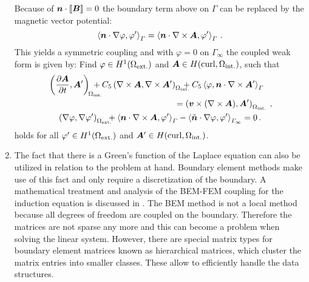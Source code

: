 \begin{enumerate}
	Because of $\bm{n}\cdot\left[\!\left[\bm{B}\right]\!\right]=0$ the boundary term above on $\varGamma$  can be replaced by the magnetic vector potential:
	\begin{equation}
		\label{eqn:RandPhi}
		\left\langle\bm{n}\cdot\nabla\varphi,\varphi'\right\rangle_{\varGamma}=\left\langle\bm{n}\cdot\nabla\times\bm{A},\varphi'\right\rangle_{\varGamma}\,.
	\end{equation}
	This yields a symmetric coupling and with $\varphi=0$ on $\varGamma_\infty$ the coupled weak form is given by: Find $\varphi\in H^1(\Omega_\mathrm{ext.})$ and $\bm{A}\in H(\operatorname{curl}, \Omega_\mathrm{int.})$, such that
	\begin{subequations}
		\label{eqn:WeakFormFinal}
		\begin{gather}
		\begin{multlined}[c]
		\left(\pd{\bm{A}}{t},\bm{A}'\right)_{\!\mathrlap{\Omega_\mathrm{int.}}\ }
		+C_5\left(\nabla\times\bm{A},\nabla\times\bm{A}'\right)_{\mathrlap{\Omega_\mathrm{int.}}\ \ }+C_5\left\langle\vp,\bm{n}\cdot\nabla\times\bm{A}'\right\rangle_{\varGamma}\\
		=\left(\bm{v}\times(\nabla\times\bm{A}),\bm{A}'\right)_{\Omega_\mathrm{int.}}\,,
		\end{multlined}\\
		\left(\nabla\vp,\nabla\vp'\right)_{\mathrlap{\Omega_\mathrm{ext.}}\,\ \ \ }+\left\langle\bm{n}\cdot\nabla\times\bm{A},\vp'\right\rangle_{\varGamma}-\left\langle\tilde{\bm{n}}\cdot\nabla\vp,\vp'\right\rangle_{\varGamma_\infty}=0\,.
		\end{gather}
	\end{subequations}
	holds for all $\varphi'\in H^1(\Omega_\mathrm{ext.})$ and $\bm{A}'\in H(\operatorname{curl}, \Omega_\mathrm{int.})$.
	\item The fact that there is a Green's function of the Laplace equation can also be utilized in relation to the problem at hand. Boundary element methods make use of this fact and only require a discretization of the boundary. A mathematical treatment and analysis of the BEM-FEM coupling for the induction equation is discussed in \cite{Lemster2014,Lemster2010}. The BEM method is not a local method because all degrees of freedom are coupled on the boundary. Therefore the matrices are not sparse any more and this can become a problem when solving the linear system. However, there are special matrix types for boundary element matrices known as hierarchical matrices, which cluster the matrix entries into smaller classes. These allow to efficiently handle the data structures.
\end{enumerate}

